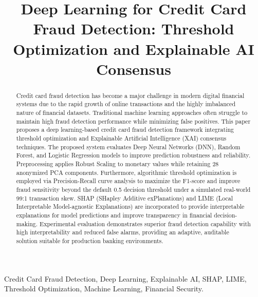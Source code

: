 \documentclass[conference]{IEEEtran}
\begin{document}
\title{Deep Learning for Credit Card Fraud Detection: Threshold Optimization and Explainable AI Consensus}

\author{
}

\maketitle

\begin{abstract}
Credit card fraud detection has become a major challenge in modern digital financial systems due to the rapid growth of online transactions and the highly imbalanced nature of financial datasets. Traditional machine learning approaches often struggle to maintain high fraud detection performance while minimizing false positives. This paper proposes a deep learning-based credit card fraud detection framework integrating threshold optimization and Explainable Artificial Intelligence (XAI) consensus techniques. The proposed system evaluates Deep Neural Networks (DNN), Random Forest, and Logistic Regression models to improve prediction robustness and reliability. Preprocessing applies Robust Scaling to monetary values while retaining 28 anonymized PCA components. Furthermore, algorithmic threshold optimization is employed via Precision-Recall curve analysis to maximize the F1-score and improve fraud sensitivity beyond the default 0.5 decision threshold under a simulated real-world 99:1 transaction skew. SHAP (SHapley Additive exPlanations) and LIME (Local Interpretable Model-agnostic Explanations) are incorporated to provide interpretable explanations for model predictions and improve transparency in financial decision-making. Experimental evaluation demonstrates superior fraud detection capability with high interpretability and reduced false alarms, providing an adaptive, auditable solution suitable for production banking environments.
\end{abstract}

\begin{IEEEkeywords}
Credit Card Fraud Detection, Deep Learning, Explainable AI, SHAP, LIME, Threshold Optimization, Machine Learning, Financial Security.
\end{IEEEkeywords}
\end{document}
